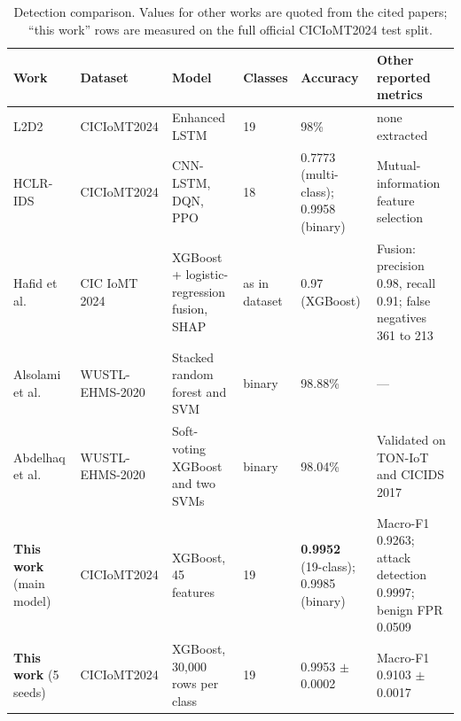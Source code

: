 \documentclass[preprint,12pt]{elsarticle}
\begin{document}
\begin{table}[htbp]
\centering
\caption{Detection comparison. Values for other works are quoted from the cited papers; ``this work'' rows are measured on the full official CICIoMT2024 test split.}
\label{tab:cmpdet}
\footnotesize
\begin{tabular}{@{}L{2.1cm}L{2.1cm}L{2.3cm}C{0.9cm}C{1.9cm}L{2.8cm}@{}}
\toprule
Work & Dataset & Model & Classes & Accuracy & Other reported metrics \\
\midrule
L2D2~\cite{akar2025} & CICIoMT2024 & Enhanced LSTM & 19 & 98\% & none extracted \\
HCLR-IDS~\cite{shaikh2025} & CICIoMT2024 & CNN-LSTM, DQN, PPO & 18 & 0.7773 (multi-class); 0.9958 (binary) & Mutual-information feature selection \\
Hafid et al.~\cite{hafid2025} & CIC IoMT 2024 & XGBoost + logistic-regression fusion, SHAP & as in dataset & 0.97 (XGBoost) & Fusion: precision 0.98, recall 0.91; false negatives 361 to 213 \\
Alsolami et al.~\cite{alsolami2024} & WUSTL-EHMS-2020 & Stacked random forest and SVM & binary & 98.88\% & --- \\
Abdelhaq et al.~\cite{abdelhaq2026} & WUSTL-EHMS-2020 & Soft-voting XGBoost and two SVMs & binary & 98.04\% & Validated on TON-IoT and CICIDS 2017 \\
\textbf{This work} (main model) & CICIoMT2024 & XGBoost, 45 features & 19 & \textbf{0.9952} (19-class); 0.9985 (binary) & Macro-F1 0.9263; attack detection 0.9997; benign FPR 0.0509 \\
\textbf{This work} (5 seeds) & CICIoMT2024 & XGBoost, 30,000 rows per class & 19 & 0.9953 $\pm$ 0.0002 & Macro-F1 0.9103 $\pm$ 0.0017 \\
\bottomrule
\end{tabular}
\end{table}
\end{document}
